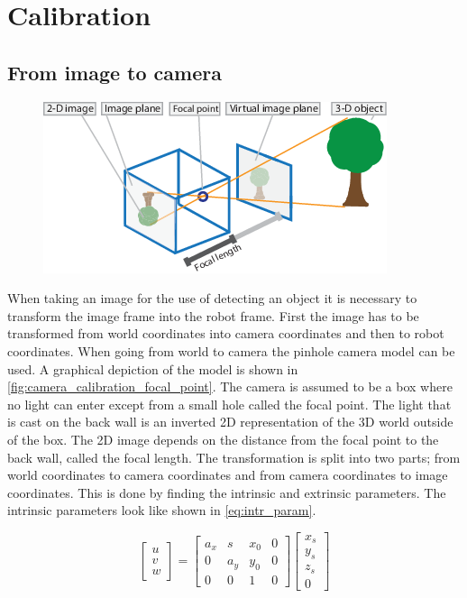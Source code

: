 \chapter{Calibration}

\section{From image to camera}
\begin{figure}[h]
\centering
\includegraphics[width=\textwidth]{figures/camera_calibration_focal_point.png}
\caption{}
\label{fig:camera_calibration_focal_point}
\end{figure}
When taking an image for the use of detecting an object it is necessary to transform the image frame into the robot frame. First the image has to be transformed from world coordinates into camera coordinates and then to robot coordinates. When going from world to camera the pinhole camera model can be used. A graphical depiction of the model is shown in \autoref{fig:camera_calibration_focal_point}. The camera is assumed to be a box where no light can enter except from a small hole called the focal point. The light that is cast on the back wall is an inverted 2D representation of the 3D world outside of the box. The 2D image depends on the distance from the focal point to the back wall, called the focal length. The transformation is split into two parts; from world coordinates to camera coordinates and from camera coordinates to image coordinates. This is done by finding the intrinsic and extrinsic parameters. The intrinsic parameters look like shown in \autoref{eq:intr_param}.

\begin{equation}\label{eq:intr_param}
\begin{bmatrix}
u \\
v \\
w 
\end{bmatrix} 
 =
\begin{bmatrix}
a_x & s & x_0 & 0 \\
0 & a_y & y_0 & 0 \\
0 & 0 & 1 & 0 
\end{bmatrix}  
\begin{bmatrix}
x_s \\
y_s \\
z_s \\
0 
\end{bmatrix}
\end{equation}

